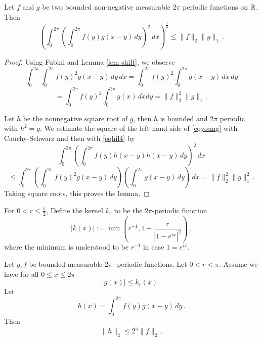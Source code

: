 {\begin{lemma}\label{young}
    Let $f$ and $g$ be two bounded non-negative measurable $2\pi$ periodic functions on $\mathbb{R}$. Then
    \begin{equation}\label{eqyoung}
        \left(\int_0^{2\pi} \left(\int_0^{2\pi}
        f(y)g(x-y)\, dy\right)^2\, dx\right)^{\frac 12}\le \|f\|_2 \|g\|_1\, .
    \end{equation}
    \end{lemma}
\begin{proof}
Using Fubini and Lemma \ref{lem shift}, we observe
\begin{equation*}
  \int_0^{2\pi}\int_0^{2\pi}f(y)^2g(x-y)\, dy
    \, dx=\int_0^{2\pi}f(y)^2\int_0^{2\pi}g(x-y)\, dx
    \, dy
\end{equation*}
\begin{equation}\label{eqhil4}
=\int_0^{2\pi}f(y)^2\int_0^{2\pi}g(x) \, dx
     dy
=\|f\|_2^2\|g\|_1\, .
\end{equation}

   Let $h$ be the  nonnegative square root of $g$, then
   $h$ is bounded and $2\pi$ periodic with $h^2=g$.
   We estimate the square of the left-hand side of
   \eqref{eqyoung} with Cauchy-Schwarz and then with
   \eqref{eqhil4} by
       \begin{equation*}
         \int_0^{2\pi} (\int_0^{2\pi}f(y)h(x-y)h(x-y)\, dy)^2\, dx
   \end{equation*}
\begin{equation}
    \le \int_0^{2\pi}\left(\int_0^{2\pi}f(y)^2g(x-y)\, dy\right)
    \left(\int_0^{2\pi}g(x-y)\, dy\right)\, dx
   = \|f\|_2^2\|g\|_1^2\, .
\end{equation}
Taking square roots, this proves the lemma.
\end{proof}

For $0<r\le \frac \pi 2$, Define the kernel $k_r$ to be the $2\pi$-periodic function
\begin{equation}
    |k(x)|:=\min \left(r^{-1}, 1+\frac r{|1-e^{ix}|^2}\right)\, ,
\end{equation}
where the minimum is understood to be $r^{-1}$ in case $1=e^{ix}$.
\begin{lemma}\label{krbound}
Let $g,f$ be bounded measurable $2\pi$-
periodic functions. Let $0<r<\pi$.
Assume we have for all $0\le x\le 2\pi$
\begin{equation}
    |g(x)|\le k_r(x)\, .
\end{equation}
Let
\begin{equation}
   h(x)= \int_0^{2\pi} f(y)g(x-y)\, dy \, .
\end{equation}
Then
\begin{equation}
   \|h\|_2\le 2^{5}\|f\|_2  \, .
\end{equation}


\end{lemma}}
